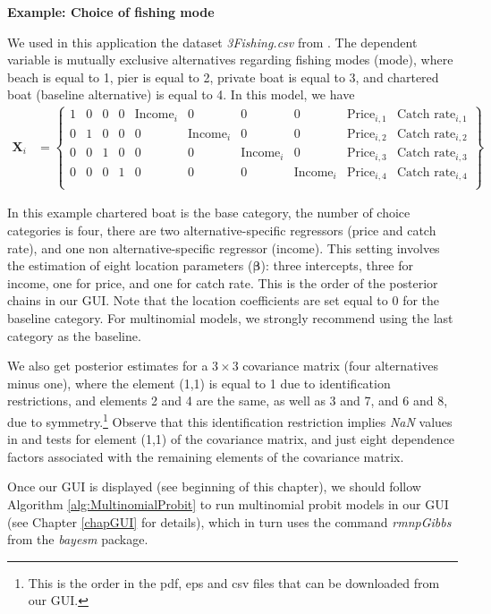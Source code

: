 \textbf{Example: Choice of fishing mode}

We used in this application the dataset \textit{3Fishing.csv} from \cite[p.~491]{cameron05}. The dependent variable is mutually exclusive alternatives regarding fishing modes (mode), where beach is equal to 1, pier is equal to 2, private boat is equal to 3, and chartered boat (baseline alternative) is equal to 4. In this model, we have
{\small{
\begin{align*}
	\bm{X}_i & = \begin{Bmatrix}
		1 & 0 & 0 & 0 & \text{Income}_i & 0 & 0 & 0 & \text{Price}_{i,1} & \text{Catch rate}_{i,1}\\ 
		0 & 1 & 0 & 0 & 0 & \text{Income}_i & 0 & 0 & \text{Price}_{i,2} & \text{Catch rate}_{i,2}\\
		0 & 0 & 1 & 0 & 0 & 0 & \text{Income}_i & 0 & \text{Price}_{i,3} & \text{Catch rate}_{i,3}\\
		0 & 0 & 0 & 1 & 0 & 0 & 0 & \text{Income}_i & \text{Price}_{i,4} & \text{Catch rate}_{i,4}\\
	\end{Bmatrix}.
\end{align*}
}}

In this example chartered boat is the base category, the number of choice categories is four, there are two alternative-specific regressors (price and catch rate), and one non alternative-specific regressor (income). This setting involves the estimation of eight location parameters ($\bm\beta$): three intercepts, three for income, one for price, and one for catch rate. This is the order of the posterior chains in our GUI. Note that the location coefficients are set equal to 0 for the baseline category. For multinomial models, we strongly recommend using the last category as the baseline.

We also get posterior estimates for a $3\times 3$ covariance matrix (four alternatives minus one), where the element (1,1) is equal to 1 due to identification restrictions, and elements 2 and 4 are the same, as well as 3 and 7, and 6 and 8, due to symmetry.\footnote{This is the order in the pdf, eps and csv files that can be downloaded from our GUI.} Observe that this identification restriction implies \textit{NaN} values in \cite{Geweke1992} and \cite{Heidelberger1983} tests for element (1,1) of the covariance matrix, and just eight dependence factors associated with the remaining elements of the covariance matrix. 

Once our GUI is displayed (see beginning of this chapter), we should follow Algorithm \ref{alg:MultinomialProbit} to run multinomial probit models in our GUI (see Chapter \ref{chapGUI} for details), which in turn uses the command \textit{rmnpGibbs} from the \textit{bayesm} package.

